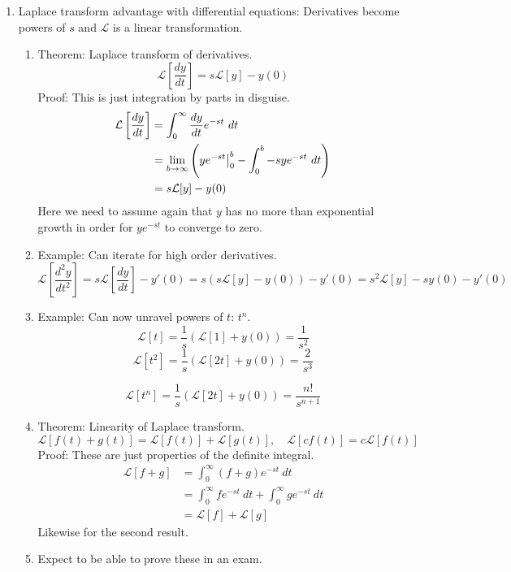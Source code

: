\documentclass{article}
\begin{document}
\begin{enumerate}
\item Laplace transform advantage with differential equations: Derivatives become powers of $s$ and $\mathcal{L}$ is a linear transformation.
\begin{enumerate}
\item Theorem: Laplace transform of derivatives.
\[
\mathcal{L}\left[ \frac{dy}{dt} \right] = s\mathcal{L}[y]-y(0)
\]
Proof: This is just integration by parts in disguise.
\begin{align*}
\mathcal{L}\left[ \frac{dy}{dt} \right]  
&= \int_0^{\infty} \frac{dy}{dt} e^{-st} ~dt \\
&= \lim_{b\rightarrow \infty} \left(ye^{-st} \big{|}_0^b - \int_0^{b} -sy e^{-st} ~dt \right)\\
&= s\mathcal{L}[y]-y(0)
\end{align*}
Here we need to assume again that $y$ has no more than exponential growth in order for $y e^{-st}$ to converge to zero.
\item Example: Can iterate for high order derivatives.
\[
\mathcal{L}\left[ \frac{d^2y}{dt^2} \right] 
= s\mathcal{L}\left[ \frac{dy}{dt} \right]-y'(0)
= s\left( s\mathcal{L}[y]-y(0)\right)-y'(0)
= s^2 \mathcal{L}[y] - sy(0) - y'(0)
\]
\item Example: Can now unravel powers of $t$: $t^n$.
\[
\mathcal{L}[t] = \frac{1}{s} \left( \mathcal{L}[1]+y(0) \right) = \frac{1}{s^2}
\]
\[
\mathcal{L}[t^2] = \frac{1}{s} \left( \mathcal{L}[2t]+y(0) \right) = \frac{2}{s^3}
\]

\[
\mathcal{L}[t^n] = \frac{1}{s} \left( \mathcal{L}[2t]+y(0) \right) = \frac{n!}{s^{n+1}}
\]
\item Theorem: Linearity of Laplace transform.
\[
\mathcal{L}\left[ f(t)+g(t) \right] = \mathcal{L}\left[ f(t) \right]+\mathcal{L}\left[ g(t) \right], \quad
\mathcal{L}\left[ cf(t) \right] = c\mathcal{L}\left[ f(t) \right]
\]
Proof: These are just properties of the definite integral.
\begin{align*}
\mathcal{L}\left[ f+g \right]  
&= \int_0^{\infty} (f+g) e^{-st} ~dt \\
&= \int_0^{\infty} f e^{-st} ~dt + \int_0^{\infty} g e^{-st} ~dt \\
&=\mathcal{L}\left[ f \right]   + \mathcal{L}\left[ g \right]  
\end{align*}
Likewise for the second result.
\item Expect to be able to prove these in an exam.
\end{enumerate}


\end{enumerate}
\end{document}
